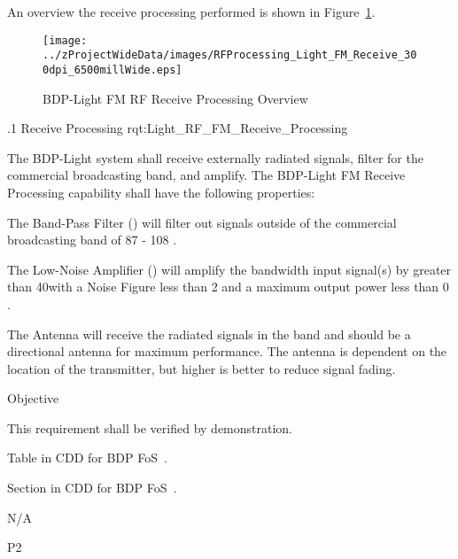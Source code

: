 An overview the \FM \RF receive processing performed is shown in Figure~\ref{fig:Light_RF_Processing_FM_Receive}.

\begin{figure}[htbp]
	\centering
		\texttt{[image: ../zProjectWideData/images/RFProcessing\_Light\_FM\_Receive\_300dpi\_6500millWide.eps]}
	\caption[BDP-Light FM RF Receive Processing Overview]{BDP-Light FM RF Receive Processing Overview}
	\label{fig:Light_RF_Processing_FM_Receive}
\end{figure}

\ONERQMTV
{\RqtNumberBase.1}
{\ThisSubSegment Receive Processing}
{rqt:Light_RF_FM_Receive_Processing}
{
The BDP-Light system shall receive externally radiated \RF signals, filter for the commercial \FM broadcasting band, and amplify. The BDP-Light FM Receive Processing capability shall have the following properties:
\begin{my_enumerate}
	\item The Band-Pass Filter (\BPF) will filter out signals outside of the commercial \FM broadcasting band of 87 - 108 \MHz.
	\item The Low-Noise Amplifier (\LNA) will amplify the \FM bandwidth input signal(s) by greater than 40\dB with a Noise Figure less than 2 \dB and a maximum output power less than 0 \dBm.
	\item The Antenna will receive the radiated \RF signals in the \FM band and should be a directional antenna for maximum performance. The antenna \HAAT is dependent on the location of the transmitter, but higher is better to reduce signal fading.
\end{my_enumerate}
}
{
	\item [Phase 1] Objective
}
{This requirement shall be verified by demonstration.}
{
	\item [5.4] Table in CDD for BDP FoS~\cite{ref__BDP_FOS_CDD}.
	\item [5.5.5] Section in CDD for BDP FoS~\cite{ref__BDP_FOS_CDD}.
}
{
\item N/A
}
{P2}

